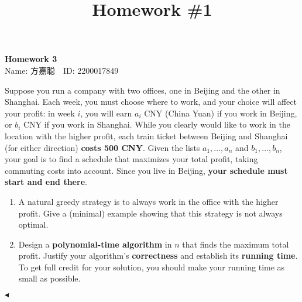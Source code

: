 \documentclass[11pt]{article}
\title{Homework \#1}
\newenvironment{problem}[2][Problem]{\begin{trivlist}
\item[\hskip \labelsep{\bfseries#1}\hskip\labelsep{\bfseries#2.}]}{\hfill$\blacktriangleleft$\end{trivlist}}
\begin{document}
\kaishu

\pagestyle{fancy}
\chead{}

\begin{center}
    {\LARGE \bf Homework 3}\\
    {Name: 方嘉聪\ \  ID: 2200017849}            %
\end{center}

\begin{problem}{1 (Commuting to Maximize Profit)}
    Suppose you run a company with two offices, one in Beijing and the other 
    in Shanghai. Each week, you must choose where to work, and your choice 
    will affect your profit: in week $i$, you will earn $a_i$ CNY (China Yuan) 
    if you work in Beijing, or $b_i$ CNY if you work in Shanghai. While you 
    clearly would like to work in the location with the higher profit, 
    each train ticket between Beijing and Shanghai (for either direction) 
    \textbf{costs 500 CNY}. Given the lists $a_1, \dots, a_n$ and $b_1,\dots, b_n$, 
    your goal is to find a schedule that maximizes your total profit, 
    taking commuting costs into account. Since you live in Beijing, 
    \textbf{your schedule must start and end there}.
    \begin{enumerate}[label = (\arabic*)]
        \item A natural greedy strategy is to always work in the office
         with the higher profit. Give a (minimal) example showing that 
         this strategy is not always optimal.
        \item Design a \textbf{polynomial-time algorithm} in $n$ that finds 
        the maximum total profit. Justify your algorithm's 
        \textbf{correctness} and establish its \textbf{running time}. 
        To get full credit for your solution, you should make your 
        running time as small as possible.
    \end{enumerate}
\end{problem}
\end{document}
